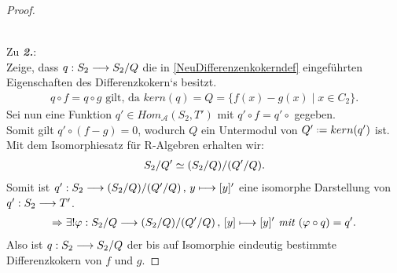 \documentclass[10pt,a4paper]{report}
\newcommand{\comment}[1]{}
\newcommand{\functionfront}[3]{\nolinebreak{#1:#2 \longrightarrow #3}}
\newcommand{\function}[5]{\nolinebreak{#1:#2 \longrightarrow #3 \, , \, #4 \longmapsto #5}}
\newcommand{\colimes}[0]{\lim\limits_{ \longrightarrow }}
\newcommand*{\defeq}{\mathrel{\vcenter{\baselineskip0.5ex \lineskiplimit0pt
                     \hbox{\scriptsize.}\hbox{\scriptsize.}}}%
                     =}
\newcommand{\kernel}[1]{kern(#1)}
\begin{document}
\begin{proof}
\begin{center}
\end{center}
\ \\
Zu \textit{\textbf{2.}}:\\
Zeige, dass $\functionfront{q}{S_2}{S_2/Q}$ die in \cref{NeuDifferenzenkokerndef} eingeführten Eigenschaften des Differenzkokern`s  besitzt.
\begin{gather*}
q \circ f = q \circ g \text{ gilt, da } \kernel{q} = Q = \lbrace f(x) - g(x)\mid x \in C_2 \rbrace.
\end{gather*}
Sei nun eine Funktion $q' \in Hom_{\mathcal{A}}(S_2,T')$ mit $q' \circ f = q' \circ$ gegeben.\\
Somit gilt $q' \circ (f - g) = 0$, wodurch $Q$ ein Untermodul von $Q' \defeq \kernel{q'}$ ist.\\ Mit dem Isomorphiesatz \comment{HOMOMORPHIESATZ [kommutative Algebra 2.10]} für R-Algebren erhalten wir:
\begin{gather*}
 \nolinebreak{S_2/Q' \simeq (S_2/Q)/(Q'/Q)}.
\end{gather*}
Somit ist $\function{q'}{S_2}{(S_2/Q)/(Q'/Q)}{y}{[y]'}$ eine isomorphe Darstellung von $\functionfront{q'}{S_2}{T'}$.
\begin{gather*}
\Rightarrow \exists ! \function{\varphi}{S_2/Q}{(S_2/Q)/(Q'/Q)}{[y]}{[y]'}\textit{ mit }(\varphi \circ q) = q'.
\end{gather*}
Also ist $\functionfront{q}{S_2}{S_2/Q}$ der bis auf Isomorphie eindeutig bestimmte Differenzkokern von $f$ und $g$.
\end{proof}
\end{document}

